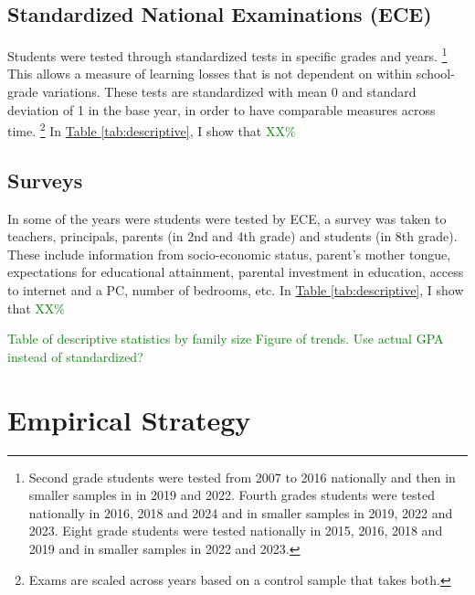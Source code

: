 \subsection{Standardized National Examinations (ECE)}

Students were tested through standardized tests in specific grades and years. \footnote{Second grade students were tested from 2007 to 2016 nationally and then in smaller samples in in 2019 and 2022. Fourth grades students were tested nationally in 2016, 2018 and 2024 and in smaller samples in 2019, 2022 and 2023. Eight grade students were tested nationally in 2015, 2016, 2018 and 2019 and in smaller samples in 2022 and 2023.} This allows a measure of learning losses that is not dependent on within school-grade variations. These tests are standardized with mean 0 and standard deviation of 1 in the base year, in order to have comparable measures across time. \footnote{Exams are scaled across years based on a control sample that takes both.} In \hyperref[tab:descriptive]{Table \ref{tab:descriptive}}, I show that \textcolor{green}{XX\%}

\subsection{Surveys}

In some of the years were students were tested by ECE, a survey was taken to teachers, principals, parents (in 2nd and 4th grade) and students (in 8th grade). These include information from socio-economic status, parent's mother tongue, expectations for educational attainment, parental investment in education, access to internet and a PC, number of bedrooms, etc. In \hyperref[tab:descriptive]{Table \ref{tab:descriptive}}, I show that \textcolor{green}{XX\%}




\textcolor{green}{Table of descriptive statistics by family size}
\textcolor{green}{Figure of trends. Use actual GPA instead of standardized?}


\section{Empirical Strategy}\label{sec:empirical_strategy}

